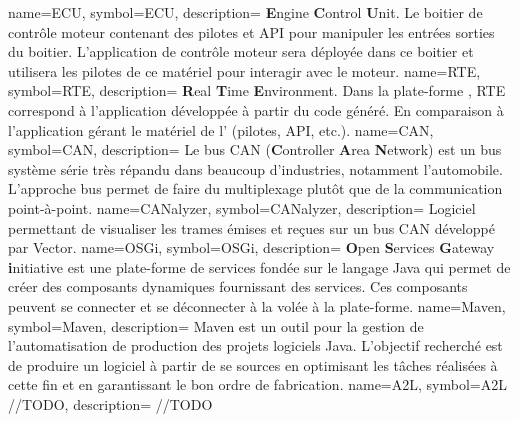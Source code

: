   {
	name=ECU,
	symbol=ECU,
	description=
	{
	  {\bf E}ngine {\bf C}ontrol {\bf U}nit. Le boitier de contrôle moteur contenant des
	  pilotes et API pour manipuler les entrées sorties du boitier. L'application de contrôle
	  moteur sera déployée dans ce boitier et utilisera les pilotes de ce matériel pour interagir avec le moteur.
	}
}
  {
	name=RTE,
	symbol=RTE,
	description=
	{
	  {\bf R}eal {\bf T}ime {\bf E}nvironment. Dans la plate-forme , RTE
	  correspond à l'application développée à partir du code généré. En comparaison à
	  l'application gérant le matériel de l' (pilotes, API, etc.).
	}
}
  {
	name=CAN,
	symbol=CAN,
	description=
	{
	  Le bus CAN ({\bf C}ontroller {\bf A}rea {\bf N}etwork) est un bus système série
	  très répandu dans beaucoup d'industries, notamment l'automobile. L'approche
	  bus permet de faire du multiplexage plutôt que de la communication point-à-point.
	}
}
  {
	name=CANalyzer,
	symbol=CANalyzer,
	description=
	{
	  Logiciel permettant de visualiser les trames émises et reçues sur un bus CAN développé par Vector. 
	}
}
  {
	name=OSGi,
	symbol=OSGi,
	description=
	{
	  {\bf O}pen {\bf S}ervices {\bf G}ateway {\bf i}nitiative est une plate-forme de services
	  fondée sur le langage Java qui permet de créer des composants dynamiques fournissant
	  des services. Ces composants peuvent se connecter et se déconnecter \og à la volée
	  \fg{} à la plate-forme.
	}
}
  {
	name=Maven,
	symbol=Maven,
	description=
	{
	  Maven est un outil pour la gestion de l'automatisation de production des projets logiciels
	  Java. L'objectif recherché est de produire un logiciel à partir de se sources en optimisant
	  les tâches réalisées à cette fin et en garantissant le bon ordre de fabrication.
	}
}
  {
	name=A2L,
	symbol=A2L //TODO,
	description=
	{
	  //TODO
	}
}
